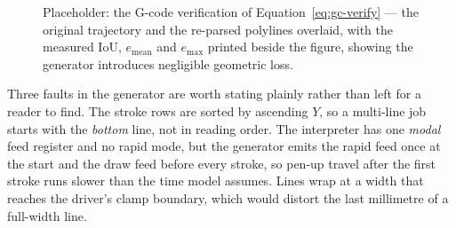 \begin{figure}[htb]
\centering
{}
\captionsetup{singlelinecheck=false,justification=justified}
\caption{Placeholder: the G-code verification of Equation~\ref{eq:gc-verify} --- the original trajectory and the re-parsed polylines overlaid, with the measured $\mathrm{IoU}$, $e_{\mathrm{mean}}$ and $e_{\max}$ printed beside the figure, showing the generator introduces negligible geometric loss.}
\label{fig:gc-verify-fig}
\end{figure}

\label{sec:gc-faults}
Three faults in the generator are worth stating plainly rather than left for a reader to find. The stroke rows are sorted by ascending $Y$, so a multi-line job starts with the \emph{bottom} line, not in reading order. The interpreter has one \emph{modal} feed register and no rapid mode, but the generator emits the rapid feed once at the start and the draw feed before every stroke, so pen-up travel after the first stroke runs slower than the time model assumes. Lines wrap at a width that reaches the driver's clamp boundary, which would distort the last millimetre of a full-width line.

\endgroup
